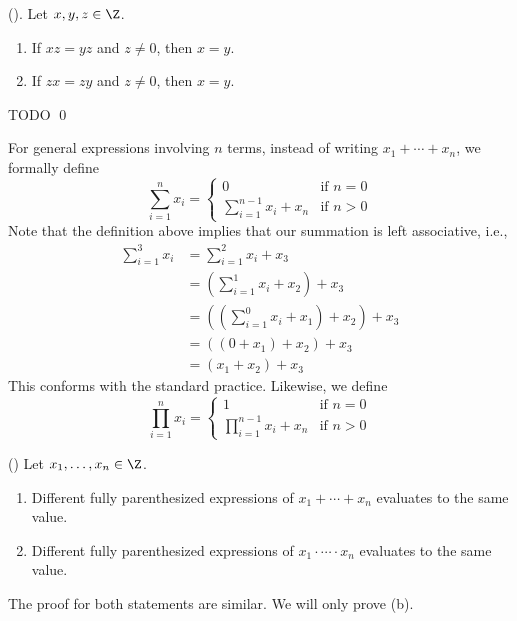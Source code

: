 \begin{prop}
\label{prop:Z-cancellation-law-for-multiplication}
  \textnormal{()}.
  Let $x, y, z \in \Z$.
  \begin{enumerate}[nosep,label=\textnormal{(\alph*)}]
    \item If $xz = yz$ and $z \neq 0$, then $x = y$.
    \item If $zx = zy$ and $z \neq 0$, then $x = y$.
  \end{enumerate}
\end{prop}
\proof
TODO
\qed

For general expressions involving $n$ terms, instead of writing
$x_1 + \cdots + x_n$, we formally define
\[
\sum_{i=1}^n x_i =
\begin{cases}
0 & \text{if } n = 0 \\
\displaystyle\sum_{i=1}^{n-1} x_i + x_n & \text{if } n > 0
\end{cases}
\]
Note that the definition above implies that our summation
is left associative, i.e.,
\begin{align*}
\sum_{i=1}^{3} x_i
&= \sum_{i=1}^{2} x_i + x_3  \\
&= \left( \sum_{i=1}^{1} x_i + x_2 \right) + x_3 \\
&= \left( \left( \sum_{i=1}^{0} x_i + x_1  \right) + x_2 \right) + x_3 \\
&= \left( \left( 0 + x_1  \right) + x_2 \right) + x_3 \\
&= \left( x_1 + x_2 \right) + x_3
\end{align*}
This conforms with the standard practice.
Likewise, we define 
\[
\prod_{i=1}^n x_i =
\begin{cases}
1 & \text{if } n = 0 \\
\displaystyle\prod_{i=1}^{n-1} x_i + x_n & \text{if } n > 0
\end{cases}
\]

\begin{prop} \textnormal{()}
Let $x_1, \ldots, x_n \in \Z$.
\begin{enumerate}[nosep,label=\textnormal{(\alph*)}]
\item Different fully parenthesized expressions of
$x_1 + \cdots + x_n$ evaluates to the same value.
\item Different fully parenthesized expressions of
$x_1 \cdot \cdots \cdot x_n$ evaluates to the same value.
\end{enumerate}
\end{prop}
\proof
The proof for both statements are similar.
We will only prove (b).

